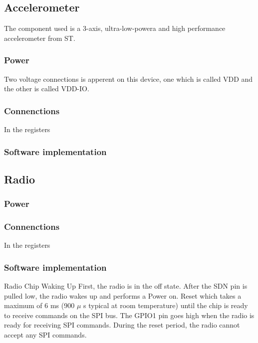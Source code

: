 \subsection{Accelerometer}
The component used is a 3-axis, ultra-low-powera and high performance accelerometer from ST\cite{STacc}.

\subsubsection{Power}
Two voltage connections is apperent on this device, one which is called VDD and the other is called VDD-IO. 

\subsubsection{Connenctions}
 In the registers 

\subsubsection{Software implementation}

\subsection{Radio}


\subsubsection{Power}


\subsubsection{Connenctions}
 In the registers 

\subsubsection{Software implementation} %
Radio Chip Waking Up First,  the  radio  is  in  the  off  state. After  the  SDN  pin  is  pulled  low,  the  radio  wakes  up  and  performs  a  Power  on.
Reset  which  takes  a  maximum  of  6 ms  (900 $\mu$ s  typical  at  room  temperature)  until  the  chip  is  ready  to  receive commands on the SPI bus. The GPIO1 pin goes high when the radio is ready for receiving SPI commands. During the reset period, the radio cannot accept any SPI commands. 

